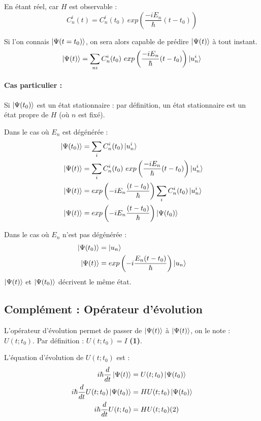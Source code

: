 \documentclass[12pt,a4paper,titlepage]{book}
\begin{document}
En étant réel, car $H$ est observable :
\begin{equation*}
C_n^i (t) = C_n^i (t_0) ~exp \left( \frac{-iE_n}{\hbar} (t-t_0) \right)
\end{equation*}

Si l'on connais $\ket{\Psi (t=t_0)}$, on sera alors capable de prédire $\ket{\Psi (t)}$ à tout instant.
\begin{equation*}
\ket{\Psi (t)} = \sum\limits_{n i} C_n^i (t_0) ~exp \left( \frac{-iE_n}{\hbar} (t-t_0) \right) \ket{u_n^i}
\end{equation*}

\paragraph*{Cas particulier :}

Si $\ket{\Psi (t_0)}$ est un état stationnaire : par définition, un état stationnaire est un état propre de $H$ (où $n$ est fixé).

Dans le cas où $E_n$ est dégénérée :
\begin{align*}
\ket{\Psi (t_0)} &= \sum\limits_i C_n^i (t_0) \ket{u_n^i}\\
\ket{\Psi (t)} &= \sum\limits_i C_n^i (t_0) ~exp\left( \frac{-i E_n}{\hbar} (t-t_0) \right) \ket{u_n^i}\\
\ket{\Psi (t)} &= exp \left( -i E_n \frac{(t-t_0)}{\hbar} \right) \sum\limits_i C_n^i (t_0) \ket{u_n^i}\\
\ket{\Psi (t)} &= exp \left( -i E_n \frac{(t-t_0)}{\hbar} \right) \ket{\Psi (t_0)}
\end{align*}

Dans le cas où $E_n$ n'est pas dégénérée :
\begin{align*}
\ket{\Psi (t_0)} &= \ket{u_n}\\
\ket{\Psi (t)} &= exp \left(-i \frac{E_n (t-t_0)}{\hbar} \right) \ket{u_n}
\end{align*}
$\ket{\Psi (t)}$ et $\ket{\Psi (t_0)}$ décrivent le même état.

\subsection{Complément : Opérateur d'évolution}

L'opérateur d'évolution permet de passer de $\ket{\Psi (t)}$ à $\ket{\Psi (t)}$, on le note : $U(t ; t_0)$. Par définition : $U(t ; t_0) = I$ \textbf{(1)}.

L'équation d'évolution de $U(t ; t_0)$ est :
\begin{align*}
i \hbar \frac{d}{dt} \ket{\Psi (t)} &= U(t ; t_0) \ket{\Psi (t_0)}\\
i \hbar \frac{d}{dt} U(t ; t_0) \ket{\Psi (t_0)} &= HU (t ; t_0) \ket{\Psi (t_0)}\\
i \hbar \frac{d}{dt} U (t ; t_0) &= HU (t ; t_0) (2)
\end{align*}
\end{document}
